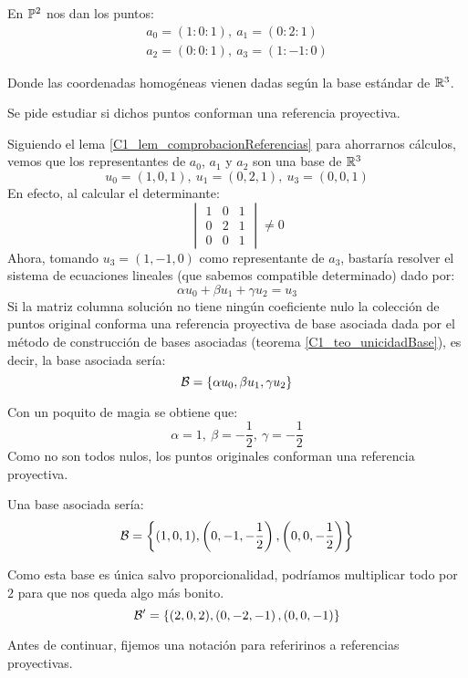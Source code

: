 \begin{exa}[Referencia de $\mb{P}^2$]
	\label{C1_exa_basesAsociadas}
	En $\mb{P}^2$ nos dan los puntos: \begin{gather*}a_0=(1:0:1),\ a_1=(0:2:1)\\a_2=(0:0:1),\ a_3=(1:-1:0)
	\end{gather*}
	
	Donde las coordenadas homogéneas vienen dadas según la base estándar de $\mathbb{R}^3$.
	
	Se pide estudiar si dichos puntos conforman una referencia proyectiva.
	
	Siguiendo el lema \ref{C1_lem_comprobacionReferencias} para ahorrarnos cálculos, vemos que los representantes de $a_0$, $a_1$ y $a_2$ son una base de $\mathbb{R}^3$
		\begin{equation*}
		u_0=(1,0,1),\ u_1=(0,2,1),\ u_3=(0,0,1)
		\end{equation*}
	En efecto, al calcular el determinante:
	\[\begin{vmatrix}
	1 & 0 & 1\\
	0 & 2 & 1\\
	0 & 0 & 1
	\end{vmatrix}\not= 0\]
	Ahora, tomando $u_3=(1,-1,0)$ como representante de $a_3$, bastaría resolver el sistema de ecuaciones lineales (que sabemos compatible determinado) dado por:
	\[\alpha u_0+\beta u_1 + \gamma u_2 = u_3\]
	Si la matriz columna solución no tiene ningún coeficiente nulo la colección de puntos original conforma una referencia proyectiva de base asociada dada por el método de construcción de bases asociadas (teorema \ref{C1_teo_unicidadBase}), es decir, la base asociada sería:\[\mathcal{B}=\{\alpha u_0,\beta u_1, \gamma u_2\}\]
	
	Con un poquito de magia se obtiene que:\[\alpha = 1,\ \beta = -\frac{1}{2},\ \gamma = -\frac{1}{2}\]
	Como no son todos nulos, los puntos originales conforman una referencia proyectiva.
	
	Una base asociada sería:
	\[
	\mathcal{B}=\left\{(1,0,1), \left(0,-1,-\frac{1}{2}\right),\left(0,0,-\frac{1}{2}\right)\right\}
	\]
	
	Como esta base es única salvo proporcionalidad, podríamos multiplicar todo por $2$ para que nos queda algo más bonito.
	\[
	\mathcal{B}'=\left\{(2,0,2), \left(0,-2,-1\right),\left(0,0,-1\right)\right\}
	\]
\end{exa}
Antes de continuar, fijemos una notación para referirinos a referencias proyectivas.

